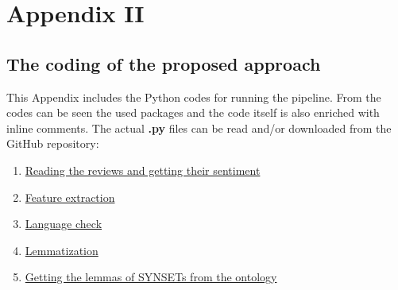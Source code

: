 \chapter{Appendix II}
\label{app2}
\section{The coding of the proposed approach}
\large
This Appendix includes the Python codes for running the pipeline. From the codes can be seen the used packages and the code itself is also enriched with inline comments. The actual \textbf{.py} files can be read and/or downloaded from the GitHub repository:

\large
\begin{enumerate}
\item \href{https://github.com/AntigoniKourou/Thesis/blob/master/reviews_sentiment.py}{Reading the reviews and getting their sentiment}
\item \href{https://github.com/AntigoniKourou/Thesis/blob/master/feature_identification.py}{Feature extraction}
\item \href{https://github.com/AntigoniKourou/Thesis/blob/639bc78aa558220cfd515ed9777b4f44aa8c0d7b/language_check.py}{Language check}
\item \href{https://github.com/AntigoniKourou/Thesis/blob/6a938f108fab5dbc39af224a643f57e682777064/lemmatization.py}{Lemmatization}
\item \href{https://github.com/AntigoniKourou/Thesis/blob/5ab99a3da8522858b091ebd8f0c289c4460fc3ee/lemmas.py}{Getting the lemmas of SYNSETs from the ontology}
\end{enumerate}





